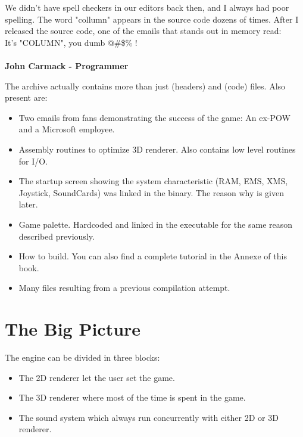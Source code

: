 \documentclass[book.tex]{subfiles}
\begin{document}
 \begin{fancyquotes}
   We didn't have spell checkers in our editors back then, and I always had poor spelling.  The word "collumn" appears in the source code dozens of times.  After I released the source code, one of the emails that stands out in memory read:
 \bigskip \\
It's "COLUMN", you dumb @\#\$\% !\\
 \bigskip \\
\textbf{John Carmack - Programmer}
 \end{fancyquotes}
 
The archive actually contains more than just  (headers) and  (code) files. Also present are:
\begin{itemize}
\item {} Two emails from fans demonstrating the success of the game: An ex-POW and a Microsoft employee.
\item {} Assembly routines to optimize 3D renderer. Also contains low level routines for I/O.
\item {} The startup screen showing the system characteristic (RAM, EMS, XMS, Joystick, SoundCards) was linked in the binary. The reason why is given later.
\item {} Game palette. Hardcoded and linked in the executable for the same reason described previously.
\item {} How to build. You can also find a complete tutorial in the Annexe of this book.
\item Many files resulting from a previous compilation attempt.
\end{itemize}







\section{The Big Picture}
The engine can be divided in three blocks:
\begin{itemize}
\item The 2D renderer let the user set the game.
\item The 3D renderer where most of the time is spent in the game.
\item The sound system which always run concurrently with either 2D or 3D renderer. 
\end{itemize}
\end{document}
